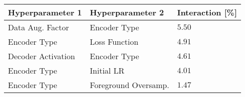 \begin{tabular}{lll}
\toprule
Hyperparameter 1 & Hyperparameter 2 & Interaction [\%] \\
\midrule
Data Aug. Factor & Encoder Type & $5.50$ \\
Encoder Type & Loss Function & $4.91$ \\
Decoder Activation & Encoder Type & $4.61$ \\
Encoder Type & Initial LR & $4.01$ \\
Encoder Type & Foreground Oversamp. & $1.47$ \\
\bottomrule
\end{tabular}
